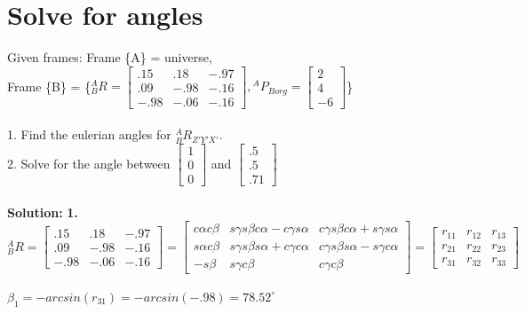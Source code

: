 \documentclass{article}
\begin{document}
\section{Solve for angles}
Given frames: Frame \{A\} = universe,\\ 
Frame \{B\} = \{${}^{A}_{B}R=\begin{bmatrix}
.15 & .18 & -.97\\
.09 & -.98 & -.16 \\
-.98 & -.06 & -.16
\end{bmatrix} ,{}^{A}P_{Borg}=\begin{bmatrix}
2  \\
4  \\
-6
\end{bmatrix} $\}\\\\
1. Find the eulerian angles for ${}^{A}_{B}R_{Z'Y'X'}$.\\
2. Solve for the angle between $\begin{bmatrix}
1\\
0\\
0
\end{bmatrix}$ and $\begin{bmatrix}
.5 \\
.5\\
.71
\end{bmatrix}$\\\\
\textbf{Solution: }
\textbf{1. }
${}^{A}_{B}R=\begin{bmatrix}
.15 & .18 & -.97\\
.09 & -.98 & -.16 \\
-.98 & -.06 & -.16
\end{bmatrix}=\begin{bmatrix}
c\alpha c\beta & s\gamma s\beta c\alpha - c\gamma s\alpha & c\gamma s\beta c\alpha + s\gamma s\alpha\\
s\alpha c\beta & s\gamma s\beta s\alpha + c\gamma c\alpha & c\gamma s\beta s\alpha - s\gamma c\alpha \\
-s\beta & s\gamma c\beta & c\gamma c\beta
\end{bmatrix}=
\begin{bmatrix}
r_{11} & r_{12} & r_{13}\\
r_{21} & r_{22} & r_{23} \\
r_{31} & r_{32} & r_{33}
\end{bmatrix}$\\\\
$\beta_1=-arcsin(r_{31})=-arcsin(-.98)=78.52^{\circ}$\\
\end{document}
